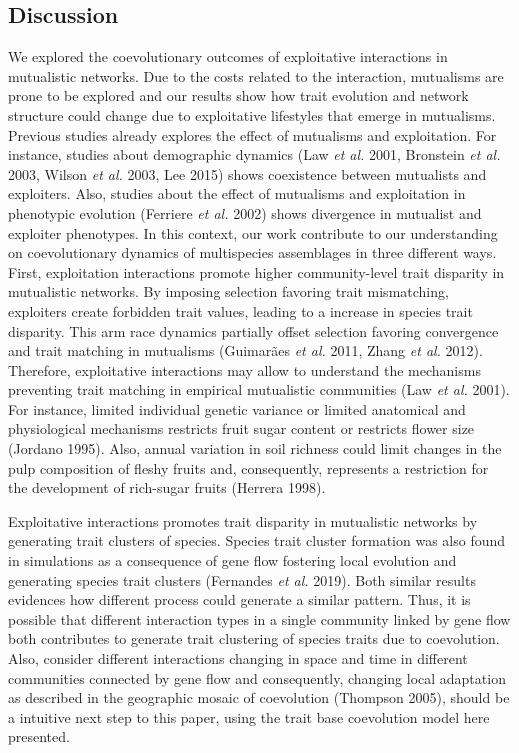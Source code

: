 \documentclass[a4paper, 12pt]{article}
\begin{document}
\subsection*{Discussion}
We explored the coevolutionary outcomes of exploitative interactions in mutualistic networks. Due to the costs related to the interaction, mutualisms are prone to be explored and our results show how trait evolution and network structure could change due to exploitative lifestyles that emerge in mutualisms. Previous studies already explores the effect of mutualisms and exploitation. For instance, studies about demographic dynamics (Law \textit{et al.} 2001, Bronstein \textit{et al.} 2003, Wilson \textit{et al.} 2003, Lee 2015) shows coexistence between mutualists and exploiters. Also, studies about the effect of mutualisms and exploitation in phenotypic evolution (Ferriere \textit{et al.} 2002) shows divergence in mutualist and exploiter phenotypes. In this context, our work contribute to our understanding on coevolutionary dynamics of multispecies assemblages in three different ways. First, exploitation interactions promote higher community-level trait disparity in mutualistic networks. By imposing selection favoring trait mismatching, exploiters create forbidden trait values, leading to a increase in species trait disparity. This arm race dynamics partially offset selection favoring convergence and trait matching in mutualisms (Guimarães \textit{et al.} 2011, Zhang \textit{et al.} 2012). Therefore, exploitative interactions may allow to understand the mechanisms preventing trait matching in empirical mutualistic communities (Law \textit{et al.} 2001). For instance, limited individual genetic variance or limited anatomical and physiological mechanisms restricts fruit sugar content or restricts flower size (Jordano 1995). Also, annual variation in soil richness could limit changes in the pulp composition of fleshy fruits and, consequently, represents a restriction for the development of rich-sugar fruits (Herrera 1998).

Exploitative interactions promotes trait disparity in mutualistic networks by generating trait clusters of species. Species trait cluster formation was also found in simulations as a consequence of gene flow fostering local evolution and generating species trait clusters (Fernandes \textit{et al.} 2019). Both similar results evidences how different process could generate a similar pattern. Thus, it is possible that different interaction types in a single community linked by gene flow both contributes to generate trait clustering of species traits due to coevolution. Also, consider different interactions changing in space and time in different communities connected by gene flow and consequently, changing local adaptation as described in the geographic mosaic of coevolution (Thompson 2005), should be a intuitive next step to this paper, using the trait base coevolution model here presented.
\end{document}
